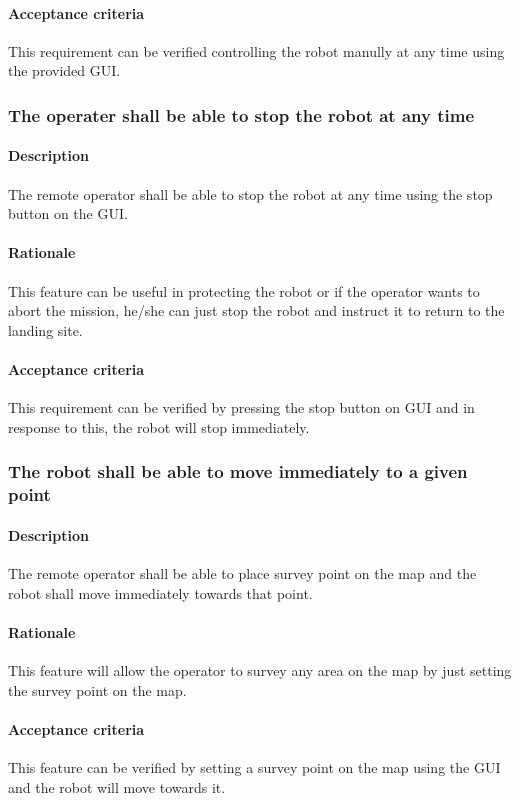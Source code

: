 \documentclass[10pt,a4paper,titlepage]{article}
\begin{document}
    \paragraph{Acceptance criteria}   This requirement can be verified controlling the robot manully at any time using the provided GUI.
    \subsubsection{The operater shall be able to stop the robot at any time}
     \paragraph{Description}   The remote operator shall be able to stop the robot at any time using the stop button on the GUI. 
    \paragraph{Rationale}   This feature can be useful in protecting the robot or if the operator wants to abort the mission, he/she can just stop the robot and instruct it to return to the landing site.
    \paragraph{Acceptance criteria}   This requirement can be verified by pressing the stop button on GUI and in response to this, the robot will stop immediately. 
    \subsubsection{The robot shall be able to move immediately to a given point}
     \paragraph{Description}   The remote operator shall be able to place survey point on the map and the robot shall move immediately towards that point.
    \paragraph{Rationale}   This feature will allow the operator to survey any area on the map by just setting the survey point on the map.
    \paragraph{Acceptance criteria}   This feature can be verified by setting a survey point on the map using the GUI and the robot will move towards it.
\end{document}

